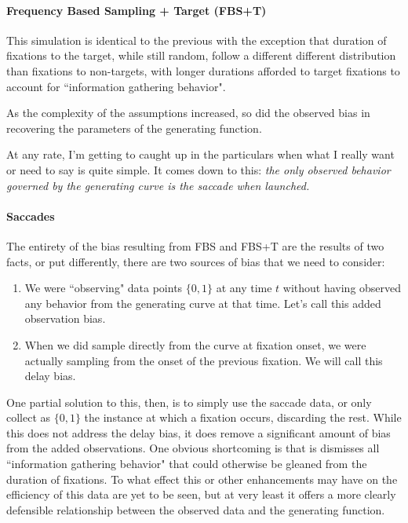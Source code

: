 \documentclass{article}
\begin{document}
\paragraph{Frequency Based Sampling + Target (FBS+T)} This simulation is identical to the previous with the exception that duration of fixations to the target, while still random, follow a different different distribution than fixations to non-targets, with longer durations afforded to target fixations to account for ``information gathering behavior". 

As the complexity of the assumptions increased, so did the observed bias in recovering the parameters of the generating function.

At any rate, I'm getting to caught up in the particulars when what I really want or need to say is quite simple. It comes down to this: \textit{the only observed behavior governed by the generating curve is the saccade when launched.} 


\paragraph{Saccades}

The entirety of the bias resulting from FBS and FBS+T are the results of two facts, or put differently, there are two sources of bias that we need to consider:

\begin{singlespace}
\begin{enumerate}
\item We were ``observing" data points $\{0,1\}$ at any time $t$ without having observed any behavior from the generating curve at that time. Let's call this added observation bias.
\item When we did sample directly from the curve at fixation onset, we were actually sampling from the onset of the previous fixation. We will call this delay bias.
\end{enumerate}
\end{singlespace}

One partial solution to this, then, is to simply use the saccade data, or only collect as $\{0,1\}$ the instance at which a fixation occurs, discarding the rest. While this does not address the delay bias, it does remove a significant amount of bias from the added observations. One obvious shortcoming is that is dismisses all ``information gathering behavior" that could otherwise be gleaned from the duration of fixations. To what effect this or other enhancements may have on the efficiency of this data are yet to be seen, but at very least it offers a more clearly defensible relationship between the observed data and the generating function.
\end{document}

